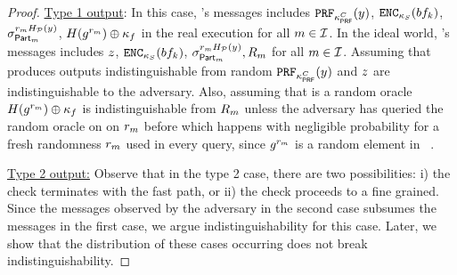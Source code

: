 \begin{proof}
\noindent \underline{Type 1 output}: In this case, \server's messages includes $ \prf{\prfKeyClient}(\genericCInputElmt)$, $\encrypt[\bloomFilterKey](\bloomFilter[\bloomFilterIdx])$, $\genericSig[\partition{\partitionIdx}]^{\genericRand_\partitionIdx \primeRO(\genericCInputElmt)}$, $\ro(\qrGen^{\genericRand_\partitionIdx}) \oplus \fileKey $ in the real execution for all $m \in \mathcal{I}$. In the ideal world, \server's messages includes $z$, $\encrypt[\bloomFilterKey](\bloomFilter[\bloomFilterIdx])$, $\genericSig[\partition{\partitionIdx}]^{\genericRand_\partitionIdx \primeRO(\genericCInputElmt)}, R_\partitionIdx$ for all $m \in \mathcal{I}$. Assuming that \prf produces outputs indistinguishable from random  $ \prf{\prfKeyClient}(\genericCInputElmt)$ and $z$ are indistinguishable to the adversary. Also, assuming that \ro is a random oracle $\ro(\qrGen^{\genericRand_\partitionIdx}) \oplus \fileKey $ is indistinguishable from $R_m$ unless the adversary has queried the random oracle on \ro on $\genericRand_\partitionIdx$ before which happens with negligible probability for a fresh randomness $\genericRand_\partitionIdx$ used in every query, since $\qrGen^{\genericRand_\partitionIdx}$ is a random element in \qrGroup~\cite{cramer2000signature}.  

\smallskip\noindent\underline{Type 2 output:} Observe that in the type 2 case, there are two possibilities: i) the check terminates with the fast path, or ii) the check proceeds to a fine grained. Since the messages observed by the adversary in the second case subsumes the messages in the first case, we argue indistinguishability for this case. Later, we show that the distribution of these cases occurring does not break indistinguishability. 


\end{proof}
